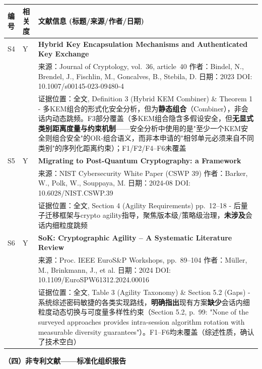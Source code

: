 ﻿\documentclass[12pt,a4paper]{article}
\begin{document}
\clearpage
\begin{tabular}{|p{1.2cm}|p{1.8cm}|p{11.0cm}|}
\hline
\textbf{编号} & \textbf{相关度} & \textbf{文献信息 (标题/来源/作者/日期)} \\
\hline
S4 & Y & \textbf{Hybrid Key Encapsulation Mechanisms and Authenticated Key Exchange} \\
& & 来源：Journal of Cryptology, vol.~36, article~40 \quad 作者：Bindel, N., Brendel, J., Fischlin, M., Goncalves, B., Stebila, D. \quad 日期：2023 \quad DOI: 10.1007/s00145-023-09480-4 \\
& & 证据位置：全文, Definition 3 (Hybrid KEM Combiner) \& Theorem 1 - 多KEM组合的形式化安全分析，但为\textbf{静态组合}（Combiner），非会话内动态跳频。F3部分覆盖（多KEM组合隐含多假设安全，但\textbf{无显式类别距离度量与约束机制}——安全分析中使用的是"至少一个KEM安全则组合安全"的OR-组合语义，而非本申请的"相邻单元必须来自不同类别"的序列化距离约束）；F1/F2/F4--F6未覆盖 \\
\hline
S5 & Y & \textbf{Migrating to Post-Quantum Cryptography: a Framework} \\
& & 来源：NIST Cybersecurity White Paper (CSWP 39) \quad 作者：Barker, W., Polk, W., Souppaya, M. \quad 日期：2024-08 \quad DOI: 10.6028/NIST.CSWP.39 \\
& & 证据位置：全文, Section 4 (Agility Requirements) pp.~12--18 - 后量子迁移框架与crypto agility指导，聚焦版本级/策略级治理，\textbf{未涉及}会话内细粒度跳频 \\
\hline
S6 & Y & \textbf{SoK: Cryptographic Agility -- A Systematic Literature Review} \\
& & 来源：Proc. IEEE EuroS\&P Workshops, pp.~89--104 \quad 作者：Müller, M., Brinkmann, J., et al. \quad 日期：2024 \quad DOI: 10.1109/EuroSPW61312.2024.00016 \\
& & 证据位置：全文, Table 3 (Agility Taxonomy) \& Section 5.2 (Gaps) - 系统综述密码敏捷的各类实现路线，\textbf{明确指出}现有方案\textbf{缺少}会话内细粒度动态切换与可度量多样性约束（Section 5.2, p.~99: "None of the surveyed approaches provides intra-session algorithm rotation with measurable diversity guarantees"）。F1--F6均未覆盖（综述性质，确认了技术空白） \\
\hline

\end{tabular}
\endgroup

\clearpage
\textbf{（四）非专利文献——标准化组织报告}
\end{document}
